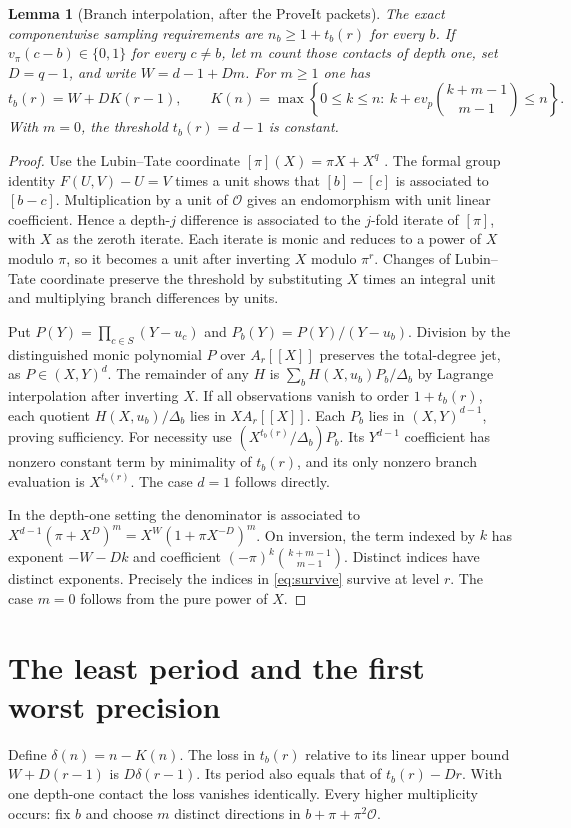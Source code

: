 \documentclass[11pt,letterpaper]{article}
\newtheorem{lemma}[theorem]{Lemma}
\newcommand{\ordp}{v_p}
\newcommand{\OO}{\mathcal O}
\begin{document}
\begin{lemma}[Branch interpolation, after the ProveIt packets]\label{lem:interp}
The exact componentwise sampling requirements are $n_b\ge 1+t_b(r)$ for every $b$.
If $v_\pi(c-b)\in\{0,1\}$ for every $c\ne b$, let $m$ count those contacts of depth one, set $D=q-1$, and write $W=d-1+Dm$. For $m\ge1$ one has
\begin{equation}
 t_b(r)=W+D K(r-1),\qquad
 K(n)=\max\left\{0\le k\le n:\ k+e\ordp\binom{k+m-1}{m-1}\le n\right\}.
 \label{eq:survive}
\end{equation}
With $m=0$, the threshold $t_b(r)=d-1$ is constant.
\end{lemma}
\begin{proof}
Use the Lubin--Tate coordinate $[\pi](X)=\pi X+X^q$ \cite{lt}. The formal group identity $F(U,V)-U=V$ times a unit shows that $[b]-[c]$ is associated to $[b-c]$. Multiplication by a unit of $\OO$ gives an endomorphism with unit linear coefficient. Hence a depth-$j$ difference is associated to the $j$-fold iterate of $[\pi]$, with $X$ as the zeroth iterate. Each iterate is monic and reduces to a power of $X$ modulo $\pi$, so it becomes a unit after inverting $X$ modulo $\pi^r$. Changes of Lubin--Tate coordinate preserve the threshold by substituting $X$ times an integral unit and multiplying branch differences by units.

Put $P(Y)=\prod_{c\in S}(Y-u_c)$ and $P_b(Y)=P(Y)/(Y-u_b)$. Division by the distinguished monic polynomial $P$ over $A_r[[X]]$ preserves the total-degree jet, as $P\in(X,Y)^d$. The remainder of any $H$ is $\sum_b H(X,u_b)P_b/\Delta_b$ by Lagrange interpolation after inverting $X$. If all observations vanish to order $1+t_b(r)$, each quotient $H(X,u_b)/\Delta_b$ lies in $X A_r[[X]]$. Each $P_b$ lies in $(X,Y)^{d-1}$, proving sufficiency. For necessity use $(X^{t_b(r)}/\Delta_b)P_b$. Its $Y^{d-1}$ coefficient has nonzero constant term by minimality of $t_b(r)$, and its only nonzero branch evaluation is $X^{t_b(r)}$. The case $d=1$ follows directly.

In the depth-one setting the denominator is associated to
$X^{d-1}(\pi+X^D)^m=X^W(1+\pi X^{-D})^m$. On inversion, the term indexed by $k$ has exponent $-W-Dk$ and coefficient $(-\pi)^k\binom{k+m-1}{m-1}$. Distinct indices have distinct exponents. Precisely the indices in \eqref{eq:survive} survive at level $r$. The case $m=0$ follows from the pure power of $X$.
\end{proof}

\section{The least period and the first worst precision}
Define $\delta(n)=n-K(n)$. The loss in $t_b(r)$ relative to its linear upper bound $W+D(r-1)$ is $D\delta(r-1)$. Its period also equals that of $t_b(r)-Dr$. With one depth-one contact the loss vanishes identically. Every higher multiplicity occurs: fix $b$ and choose $m$ distinct directions in $b+\pi+\pi^2\OO$.
\end{document}
